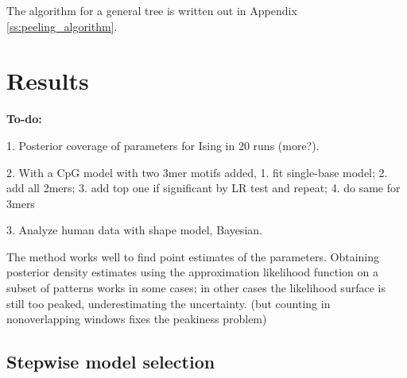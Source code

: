 \documentclass{article}
\theoremstyle{plain}
\theoremstyle{definition}
\begin{document}
The algorithm for a general tree is written out in Appendix \ref{ss:peeling_algorithm}.


\section{Results}

\textbf{To-do:} 

1. Posterior coverage of parameters for Ising in 20 runs (more?).

2. With a CpG model with two 3mer motifs added, 1. fit single-base model; 2. add all 2mers; 3. add top one if significant by LR test and repeat; 4. do same for 3mers

3. Analyze human data with shape model, Bayesian.

The method works well to find point estimates of the parameters.
Obtaining posterior density estimates using the approximation likelihood function on a subset of patterns
works in some cases;
in other cases the likelihood surface is still too peaked, underestimating the uncertainty.
(but counting in nonoverlapping windows fixes the peakiness problem)

\subsection{Stepwise model selection}
\end{document}
